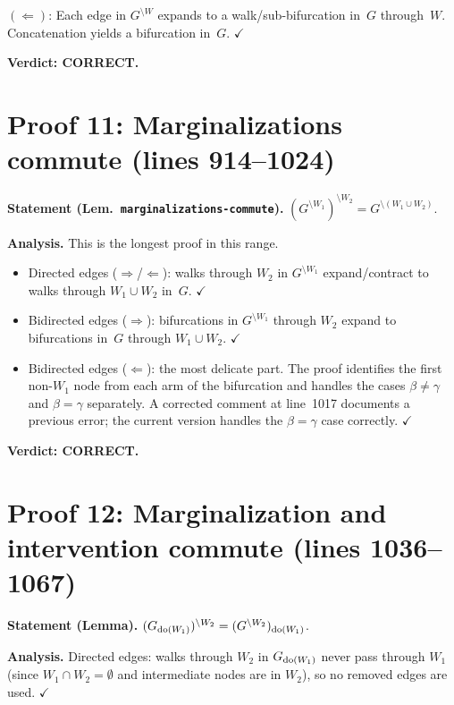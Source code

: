 \documentclass{article}
\begin{document}
$(\Leftarrow)$: Each edge in $G^{\setminus W}$ expands to a walk/sub-bifurcation
in~$G$ through~$W$.  Concatenation yields a bifurcation in~$G$.  $\checkmark$

\textbf{Verdict: CORRECT.}

\section{Proof 11: Marginalizations commute (lines 914--1024)}

\textbf{Statement (Lem.\ \texttt{marginalizations-commute}).}
$(G^{\setminus W_1})^{\setminus W_2} = G^{\setminus(W_1\cup W_2)}$.

\textbf{Analysis.}
This is the longest proof in this range.
\begin{itemize}
  \item Directed edges ($\Rightarrow$/$\Leftarrow$): walks through $W_2$ in
    $G^{\setminus W_1}$ expand/contract to walks through $W_1\cup W_2$ in~$G$.  $\checkmark$
  \item Bidirected edges ($\Rightarrow$): bifurcations in $G^{\setminus W_1}$
    through $W_2$ expand to bifurcations in~$G$ through $W_1\cup W_2$.  $\checkmark$
  \item Bidirected edges ($\Leftarrow$): the most delicate part.  The proof
    identifies the first non-$W_1$ node from each arm of the bifurcation and
    handles the cases $\beta\neq\gamma$ and $\beta=\gamma$ separately.
    A corrected comment at line~1017 documents a previous error; the current
    version handles the $\beta=\gamma$ case correctly.  $\checkmark$
\end{itemize}

\textbf{Verdict: CORRECT.}

\section{Proof 12: Marginalization and intervention commute (lines 1036--1067)}

\textbf{Statement (Lemma).}
$(G_{\operatorname{do}(W_1)})^{\setminus W_2} = (G^{\setminus W_2})_{\operatorname{do}(W_1)}$.

\textbf{Analysis.}
Directed edges: walks through $W_2$ in $G_{\operatorname{do}(W_1)}$ never pass through $W_1$
(since $W_1\cap W_2=\emptyset$ and intermediate nodes are in $W_2$),
so no removed edges are used.  $\checkmark$
\end{document}

